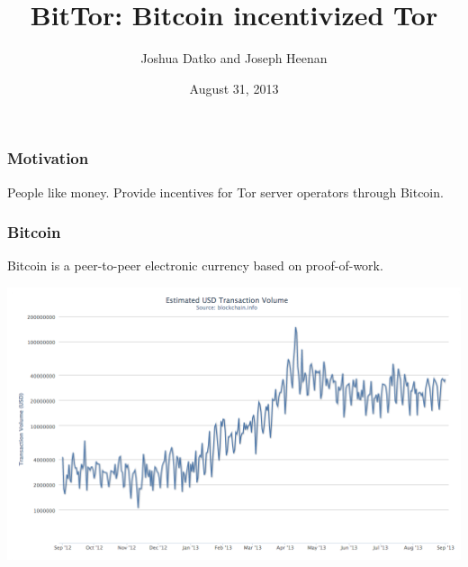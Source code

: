 \documentclass{beamer}
\title[BitTor]{BitTor: Bitcoin incentivized Tor}
\author[J. Datko and J. Heenan]{Joshua Datko and Joseph Heenan}
\institute[Drexel]{
  Department of Computer Science\\
  Drexel Univeristy\\
  Philadelphia, PA 19103\\[1ex]
}
\date[August 2013]{August 31, 2013}
\begin{document}
\begin{frame}[plain]
  \titlepage
\end{frame}


\begin{frame}
  \frametitle{Motivation}


  \begin{block}{People like money.}
    Provide incentives for Tor server operators through Bitcoin.
  \end{block}
\end{frame}

\begin{frame}
  \frametitle{Bitcoin}

  Bitcoin is a peer-to-peer electronic currency based on
  proof-of-work. \cite{nakamoto2009bitcoin}

  \includegraphics[width=\textwidth,height=0.8\textheight,keepaspectratio]{bitcoin_volume}

\end{frame}
\end{document}
